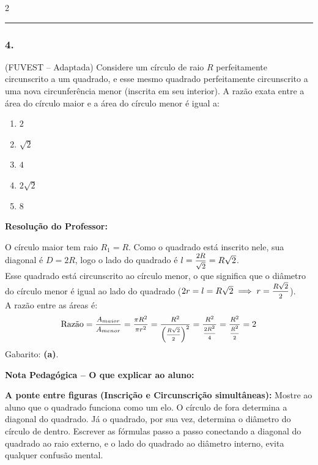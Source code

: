 \begin{multicols*}{2}
\par\vspace{\espacoQuestao}

\noindent\textcolor{CorLinha}{\rule{\linewidth}{0.5pt}} 
\par\vspace{\espacoPreQuestao}

\subsubsection*{4.} (FUVEST -- Adaptada) Considere um círculo de raio $R$ perfeitamente circunscrito a um quadrado, e esse mesmo quadrado perfeitamente circunscrito a uma nova circunferência menor (inscrita em seu interior). A razão exata entre a área do círculo maior e a área do círculo menor é igual a:

\begin{enumerate}[label=\alph*)]
    \item $2$
    \item $\sqrt{2}$
    \item $4$
    \item $2\sqrt{2}$
    \item $8$
\end{enumerate}

\ifgabarito
    \begin{tcolorbox}[colback=CorTitUm!5, colframe=CorTitUm, boxrule=1pt, arc=4pt, left=6pt, right=6pt, top=6pt, bottom=6pt]
    \small\textbf{\textcolor{CorTitUm}{Resolução do Professor:}}\par\vspace{0.1cm}
    \color{CinzaEscuro}
    O círculo maior tem raio $R_1 = R$. Como o quadrado está inscrito nele, sua diagonal é $D = 2R$, logo o lado do quadrado é $l = \mfrac{2R}{\sqrt{2}} = R\sqrt{2}$. 
    \\[0.1cm]
    Esse quadrado está circunscrito ao círculo menor, o que significa que o diâmetro do círculo menor é igual ao lado do quadrado ($2r = l = R\sqrt{2} \implies r = \mfrac{R\sqrt{2}}{2}$).
    \\[0.1cm]
    A razão entre as áreas é:
    \[ \text{Razão} = \mfrac{A_{maior}}{A_{menor}} = \mfrac{\pi R^2}{\pi r^2} = \mfrac{R^2}{\left(\mfrac{R\sqrt{2}}{2}\right)^2} = \mfrac{R^2}{\mfrac{2R^2}{4}} = \mfrac{R^2}{\mfrac{R^2}{2}} = 2 \]
    Gabarito: \textbf{(a)}.
    \end{tcolorbox}
    
    \begin{boxpedagogica}
    \textbf{\textcolor{CorVerdeBorda}{Nota Pedagógica -- O que explicar ao aluno:}}\par\vspace{0.1cm}
    \color{CinzaEscuro}
    \textbf{A ponte entre figuras (Inscrição e Circunscrição simultâneas):} Mostre ao aluno que o quadrado funciona como um elo. O círculo de fora determina a diagonal do quadrado. Já o quadrado, por sua vez, determina o diâmetro do círculo de dentro. Escrever as fórmulas passo a passo conectando a diagonal do quadrado ao raio externo, e o lado do quadrado ao diâmetro interno, evita qualquer confusão mental.
    \end{boxpedagogica}
\fi


\end{multicols*}
